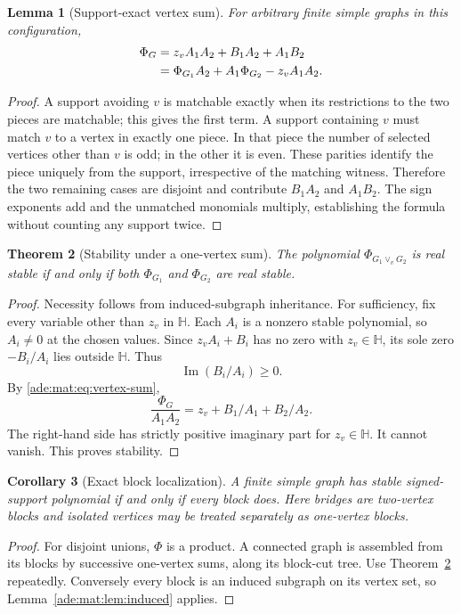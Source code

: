 \documentclass[11pt]{article}
\numberwithin{equation}{section}
\newtheorem{theorem}{Theorem}[section]
\newtheorem{lemma}[theorem]{Lemma}
\newtheorem{corollary}[theorem]{Corollary}
\theoremstyle{definition}
\newcommand{\HH}{\mathbb H}
\newcommand{\im}{\operatorname{Im}}
\begin{document}
\begin{lemma}[Support-exact vertex sum]\label{ade:mat:lem:vertex-sum}
For arbitrary finite simple graphs in this configuration,
\begin{align}
 \Phi_G&=z_vA_1A_2+B_1A_2+A_1B_2 \label{ade:mat:eq:vertex-sum}\\
       &=\Phi_{G_1}A_2+A_1\Phi_{G_2}-z_vA_1A_2.\notag
\end{align}
\end{lemma}
\begin{proof}
A support avoiding $v$ is matchable exactly when its restrictions to the two
pieces are matchable; this gives the first term. A support containing $v$
must match $v$ to a vertex in exactly one piece. In that piece the number
of selected vertices other than $v$ is odd; in the other it is even.
These parities identify the piece uniquely from the support, irrespective
of the matching witness. Therefore the two remaining cases are disjoint
and contribute $B_1A_2$ and $A_1B_2$. The sign exponents add and the
unmatched monomials multiply, establishing the formula without counting
any support twice.
\end{proof}

\begin{theorem}[Stability under a one-vertex sum]\label{ade:mat:thm:vertex-stable}
The polynomial $\Phi_{G_1\vee_vG_2}$ is real stable if and only if both
$\Phi_{G_1}$ and $\Phi_{G_2}$ are real stable.
\end{theorem}
\begin{proof}
Necessity follows from induced-subgraph inheritance. For sufficiency,
fix every variable other than $z_v$ in $\HH$. Each $A_i$ is a nonzero
stable polynomial, so $A_i\ne0$ at the chosen values. Since
$z_vA_i+B_i$ has no zero with $z_v\in\HH$, its sole zero
$-B_i/A_i$ lies outside $\HH$. Thus
\[
 \im(B_i/A_i)\geq0.
\]
By \eqref{ade:mat:eq:vertex-sum},
\[
 \frac{\Phi_G}{A_1A_2}=z_v+B_1/A_1+B_2/A_2.
\]
The right-hand side has strictly positive imaginary part for $z_v\in\HH$.
It cannot vanish. This proves stability.
\end{proof}

\begin{corollary}[Exact block localization]\label{ade:mat:cor:blocks}
A finite simple graph has stable signed-support polynomial if and only if
every block does. Here bridges are two-vertex blocks and isolated vertices
may be treated separately as one-vertex blocks.
\end{corollary}
\begin{proof}
For disjoint unions, $\Phi$ is a product. A connected graph is assembled
from its blocks by successive one-vertex sums, along its block-cut tree.
Use Theorem~\ref{ade:mat:thm:vertex-stable} repeatedly. Conversely every block is
an induced subgraph on its vertex set, so Lemma~\ref{ade:mat:lem:induced} applies.
\end{proof}
\end{document}
